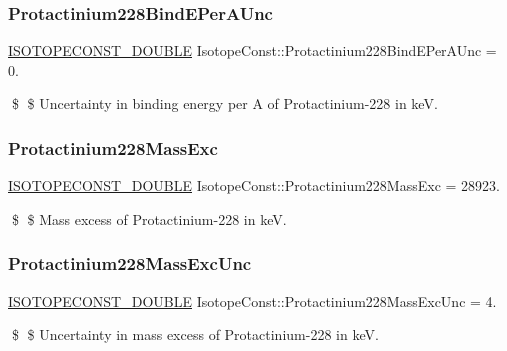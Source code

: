 \subsubsection{\texorpdfstring{Protactinium228\+Bind\+E\+Per\+A\+Unc}{Protactinium228BindEPerAUnc}}
{\footnotesize\ttfamily \mbox{\hyperlink{group___isotope_const-_macros_ga8f45a7272ce02c0b4c65c44636ed719a}{I\+S\+O\+T\+O\+P\+E\+C\+O\+N\+S\+T\+\_\+\+D\+O\+U\+B\+LE}} Isotope\+Const\+::\+Protactinium228\+Bind\+E\+Per\+A\+Unc = 0.}

\$ \$ Uncertainty in binding energy per A of Protactinium-\/228 in keV. \mbox{\label{group___isotope_const-_protactinium-_pa228_ga935af6002371c0b6fdba46285296ef97}} 
\subsubsection{\texorpdfstring{Protactinium228\+Mass\+Exc}{Protactinium228MassExc}}
{\footnotesize\ttfamily \mbox{\hyperlink{group___isotope_const-_macros_ga8f45a7272ce02c0b4c65c44636ed719a}{I\+S\+O\+T\+O\+P\+E\+C\+O\+N\+S\+T\+\_\+\+D\+O\+U\+B\+LE}} Isotope\+Const\+::\+Protactinium228\+Mass\+Exc = 28923.}

\$ \$ Mass excess of Protactinium-\/228 in keV. \mbox{\label{group___isotope_const-_protactinium-_pa228_ga2f193f413be1175ea9ab4490ba769042}} 
\subsubsection{\texorpdfstring{Protactinium228\+Mass\+Exc\+Unc}{Protactinium228MassExcUnc}}
{\footnotesize\ttfamily \mbox{\hyperlink{group___isotope_const-_macros_ga8f45a7272ce02c0b4c65c44636ed719a}{I\+S\+O\+T\+O\+P\+E\+C\+O\+N\+S\+T\+\_\+\+D\+O\+U\+B\+LE}} Isotope\+Const\+::\+Protactinium228\+Mass\+Exc\+Unc = 4.}

\$ \$ Uncertainty in mass excess of Protactinium-\/228 in keV. \mbox{\label{group___isotope_const-_protactinium-_pa228_ga8bd676c2872f4837bc9b7b2576758740}} 
